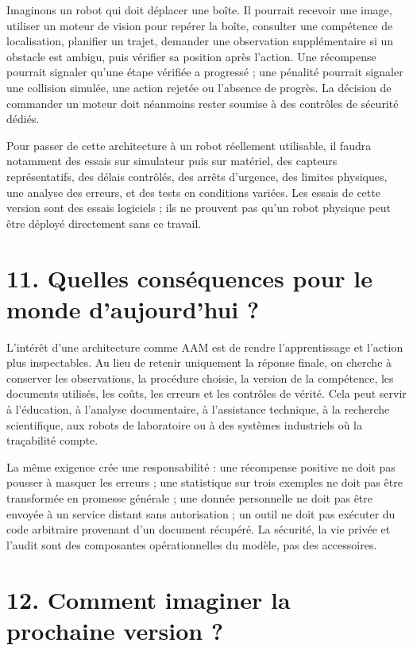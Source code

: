 \documentclass[11pt,a4paper]{article}
\begin{document}
Imaginons un robot qui doit déplacer une boîte. Il pourrait recevoir une image, utiliser un moteur de vision pour repérer la boîte, consulter une compétence de localisation, planifier un trajet, demander une observation supplémentaire si un obstacle est ambigu, puis vérifier sa position après l'action. Une récompense pourrait signaler qu'une étape vérifiée a progressé ; une pénalité pourrait signaler une collision simulée, une action rejetée ou l'absence de progrès. La décision de commander un moteur doit néanmoins rester soumise à des contrôles de sécurité dédiés.

Pour passer de cette architecture à un robot réellement utilisable, il faudra notamment des essais sur simulateur puis sur matériel, des capteurs représentatifs, des délais contrôlés, des arrêts d'urgence, des limites physiques, une analyse des erreurs, et des tests en conditions variées. Les essais de cette version sont des essais logiciels ; ils ne prouvent pas qu'un robot physique peut être déployé directement sans ce travail.

\section*{11. Quelles conséquences pour le monde d'aujourd'hui ?}

L'intérêt d'une architecture comme AAM est de rendre l'apprentissage et l'action plus inspectables. Au lieu de retenir uniquement la réponse finale, on cherche à conserver les observations, la procédure choisie, la version de la compétence, les documents utilisés, les coûts, les erreurs et les contrôles de vérité. Cela peut servir à l'éducation, à l'analyse documentaire, à l'assistance technique, à la recherche scientifique, aux robots de laboratoire ou à des systèmes industriels où la traçabilité compte.

La même exigence crée une responsabilité : une récompense positive ne doit pas pousser à masquer les erreurs ; une statistique sur trois exemples ne doit pas être transformée en promesse générale ; une donnée personnelle ne doit pas être envoyée à un service distant sans autorisation ; un outil ne doit pas exécuter du code arbitraire provenant d'un document récupéré. La sécurité, la vie privée et l'audit sont des composantes opérationnelles du modèle, pas des accessoires.

\section*{12. Comment imaginer la prochaine version ?}
\end{document}
